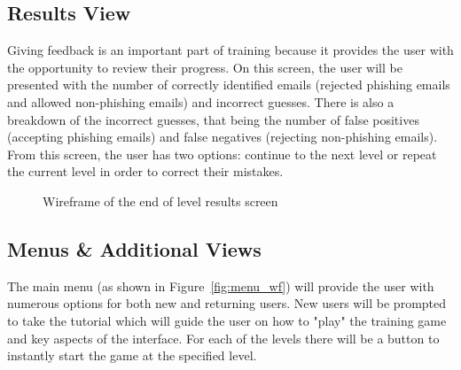 \documentclass{l4proj}
\begin{document}
\subsection{Results View}
Giving feedback is an important part of training because it provides the user with the opportunity to review their progress. On this screen, the user will be presented with the number of correctly identified emails (rejected phishing emails and allowed non-phishing emails) and incorrect guesses. There is also a breakdown of the incorrect guesses, that being the number of false positives (accepting phishing emails) and false negatives (rejecting non-phishing emails). From this screen, the user has two options: continue to the next level or repeat the current level in order to correct their mistakes. 

\begin{figure}[H]
    \centering
    \caption{Wireframe of the end of level results screen}
    \label{fig:results_wf} 
\end{figure}

\subsection{Menus \& Additional Views}
The main menu (as shown in Figure~\ref{fig:menu_wf}) will provide the user with numerous options for both new and returning users. New users will be prompted to take the tutorial which will guide the user on how to "play" the training game and key aspects of the interface. For each of the levels there will be a button to instantly start the game at the specified level.
\end{document}
